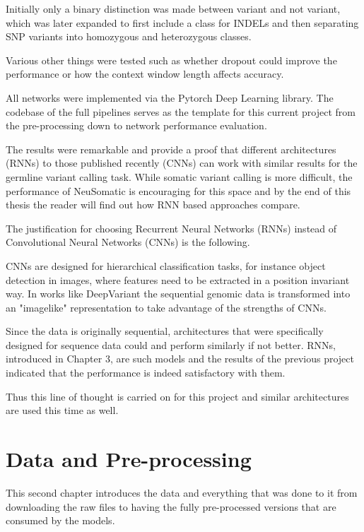 \documentclass[bsc,frontabs,singlespacing,parskip,deptreport]{infthesis}
\begin{document}
Initially only a binary distinction was made between variant and not variant, which was later expanded to first include a class for INDELs and then separating SNP variants into homozygous and heterozygous classes.  
 
Various other things were tested such as whether dropout \cite{dropout} could improve the performance or how the context window length affects accuracy.

All networks were implemented via the Pytorch \cite{pytorch} Deep Learning library. The codebase of the full pipelines serves as the template for this current project from the pre-processing down to network performance evaluation.

The results were remarkable and provide a proof that different architectures (RNNs) to those published recently (CNNs) can work with similar results for the germline variant calling task. While somatic variant calling is more difficult, the performance of NeuSomatic is encouraging for this space and by the end of this thesis the reader will find out how RNN based approaches compare.

The justification for choosing Recurrent Neural Networks (RNNs) instead of Convolutional Neural Networks (CNNs) is the following. 

CNNs are designed for hierarchical classification tasks, for instance object detection in images, where features need to be extracted in a position invariant way. In works like DeepVariant \cite{deepvariant} the sequential genomic data is transformed into an "imagelike" representation to take advantage of the strengths of CNNs.

Since the data is originally sequential, architectures that were specifically designed for sequence data could and perform similarly if not better. RNNs, introduced in Chapter 3, are such models and the results of the previous project indicated that the performance is indeed satisfactory with them.

Thus this line of thought is carried on for this project and similar architectures are used this time as well. 





\chapter{Data and Pre-processing}

This second chapter introduces the data and everything that was done to it from downloading the raw files to having the fully pre-processed versions that are consumed by the models.
\end{document}
